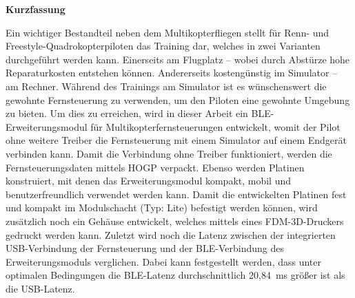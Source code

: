 
\pagestyle{empty}

\newenvironment{abstractpage}
  {\cleardoublepage\vspace*{\fill}\thispagestyle{empty}}
  {\vfill\cleardoublepage}
\newenvironment{abstractsection}[1]
  {\bigskip
   \begin{center}\bfseries#1\end{center}}
  {\par\bigskip}

\begin{abstractpage}
    \begin{abstractsection}{Kurzfassung}
      Ein wichtiger Bestandteil neben dem Multikopterfliegen stellt für Renn- und Freestyle-Quadro\-kopterpiloten das Training dar, welches in zwei Varianten durchgeführt werden kann. Einerseits am Flugplatz -- wobei durch Abstürze hohe Reparaturkosten entstehen können. Andererseits kostengünstig im Simulator -- am Rechner. Während des Trainings am Simulator ist es wünschenswert die gewohnte Fernsteuerung zu verwenden, um den Piloten eine gewohnte Umgebung zu bieten. Um dies zu erreichen, wird in dieser Arbeit ein \acs{BLE}-Erweiterungsmodul für Multikopterfernsteuerungen entwickelt, womit der Pilot ohne weitere Treiber die Fernsteuerung mit einem Simulator auf einem Endgerät verbinden kann. Damit die Verbindung ohne Treiber funktioniert, werden die Fernsteuerungsdaten mittels \acs{HOGP} verpackt. Ebenso werden Platinen konstruiert, mit denen das Erweiterungsmodul kompakt, mobil und benutzerfreundlich verwendet werden kann. Damit die entwickelten Platinen fest und kompakt im Modulschacht (Typ: Lite) befestigt werden können, wird zusätzlich noch ein Gehäuse entwickelt, welches mittels eines \acs{FDM}-3D-Druckers gedruckt werden kann. Zuletzt wird noch die Latenz zwischen der integrierten USB-Verbindung der Fernsteuerung und der \acs{BLE}-Verbindung des Erweiterungsmoduls verglichen. Dabei kann festgestellt werden, dass unter optimalen Bedingungen die \acs{BLE}-Latenz durchschnittlich 20,84~ms größer ist als die USB-Latenz. 
    \end{abstractsection}


\end{abstractpage}
